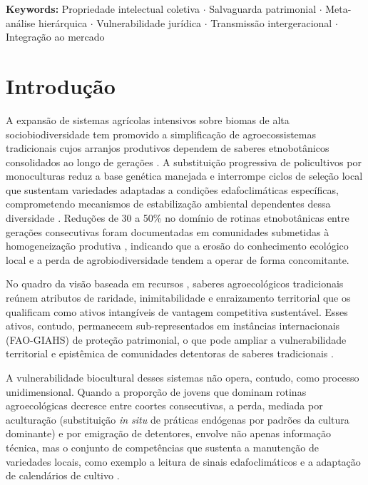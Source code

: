 \documentclass[12pt,a4paper]{article}
\begin{document}
\medskip
\noindent\textbf{Keywords:} Propriedade intelectual coletiva $\cdot$ Salvaguarda patrimonial $\cdot$ Meta-análise hierárquica $\cdot$ Vulnerabilidade jurídica $\cdot$ Transmissão intergeracional $\cdot$ Integração ao mercado

\linenumbers

\section{Introdução}
\label{sec:intro}

A expansão de sistemas agrícolas intensivos sobre biomas de alta sociobiodiversidade tem promovido a simplificação de agroecossistemas tradicionais cujos arranjos produtivos dependem de saberes etnobotânicos consolidados ao longo de gerações \citep{Altieri2004}. A substituição progressiva de policultivos por monoculturas reduz a base genética manejada e interrompe ciclos de seleção local que sustentam variedades adaptadas a condições edafoclimáticas específicas, comprometendo mecanismos de estabilização ambiental dependentes dessa diversidade \citep{Jarvis2008}. Reduções de 30 a 50\% no domínio de rotinas etnobotânicas entre gerações consecutivas foram documentadas em comunidades submetidas à homogeneização produtiva \citep{ReyesGarcia2013}, indicando que a erosão do conhecimento ecológico local e a perda de agrobiodiversidade tendem a operar de forma concomitante.

No quadro da visão baseada em recursos \citep{Barney1991}, saberes agroecológicos tradicionais reúnem atributos de raridade, inimitabilidade e enraizamento territorial que os qualificam como ativos intangíveis de vantagem competitiva sustentável. Esses ativos, contudo, permanecem sub-representados em instâncias internacionais (FAO-GIAHS) de proteção patrimonial, o que pode ampliar a vulnerabilidade territorial e epistêmica de comunidades detentoras de saberes tradicionais \citep{Santilli2009,Cunha2009,Goncalves2022}.

A vulnerabilidade biocultural desses sistemas não opera, contudo, como processo unidimensional. Quando a proporção de jovens que dominam rotinas agroecológicas decresce entre coortes consecutivas, a perda, mediada por aculturação (substituição \textit{in situ} de práticas endógenas por padrões da cultura dominante) e por emigração de detentores, envolve não apenas informação técnica, mas o conjunto de competências que sustenta a manutenção de variedades locais, como exemplo a leitura de sinais edafoclimáticos e a adaptação de calendários de cultivo \citep{ReyesGarcia2013,GomezBaggethun2013}.
\end{document}
